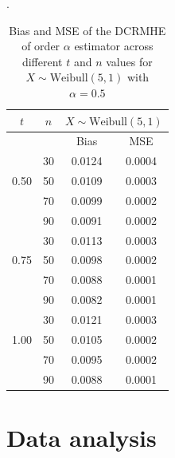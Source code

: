 \documentclass[11pt,reqno]{amsart}
\theoremstyle{tight}
\begin{document}
\begin{table}[h!]
\centering
\caption{Bias and MSE of the DCRMHE of order $\alpha$ estimator across different $t$ and $n$ values for ${X \sim \text{Weibull}(5,1)}$ with $\alpha=0.5$}.
    \label{DCRMHE alpha=0.5}
\begin{tabular}{|c|c|cc|}
\toprule
$t$ & $n$ & \multicolumn{2}{c|}{$X \sim \text{Weibull}(5,1)$ }  \\
\midrule
&  &Bias & MSE \\
\midrule
       &30 &0.0124 &0.0004   \\
0.50       &50 &0.0109 &0.0003   \\
 &70 & 0.0099 &0.0002  \\
       &90 &0.0091 & 0.0002  \\

       \midrule
       &30 &0.0113 & 0.0003  \\
       0.75&50 &0.0098 &0.0002   \\
        &70 &0.0088&0.0001 \\
       &90 &0.0082&0.0001   \\

       \midrule
       &30 &0.0121&0.0003   \\
  1.00     &50 &0.0105&0.0002   \\
 &70 &0.0095 &0.0002   \\
       &90 &0.0088 &0.0001   \\

        \bottomrule

\end{tabular}
\end{table}



\section{Data analysis}
\end{document}
